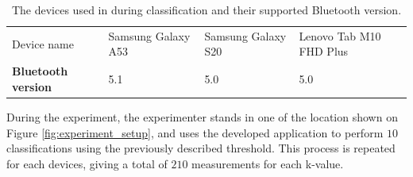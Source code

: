 \begin{table}[]
    \begin{tabular}{llll}
    Device name                & Samsung Galaxy A53 & Samsung Galaxy S20 & Lenovo Tab M10 FHD Plus \\
    \textbf{Bluetooth version} & 5.1                & 5.0                & 5.0                    
    \end{tabular}
    \caption{The devices used in during classification and their supported Bluetooth version.}
    \label{tab:devicesAndBluetooth}
\end{table}

During the experiment, the experimenter stands in one of the location shown on Figure \ref{fig:experiment_setup}, and uses the developed application to perform $10$ classifications using the previously described threshold.
This process is repeated for each devices, giving a total of $210$ measurements for each k-value.